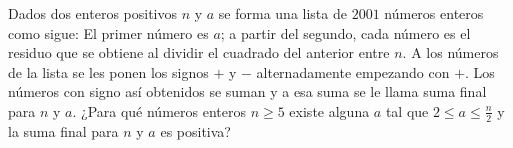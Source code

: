 Dados dos enteros positivos $n$ y $a$ se forma una lista de $2001$ números enteros como sigue: El primer número es $a$; a partir del segundo, cada número es el residuo que se obtiene al dividir el cuadrado del anterior entre $n$. A los números de la lista se les ponen los signos $+$ y $-$ alternadamente empezando con $+$. Los números con signo así obtenidos se suman y a esa suma se le llama suma final para $n$ y $a$. ¿Para qué números enteros $n\geq 5$ existe alguna $a$ tal que $2\leq a \leq \frac{n}{2}$ y la suma final para $n$ y $a$ es positiva?
